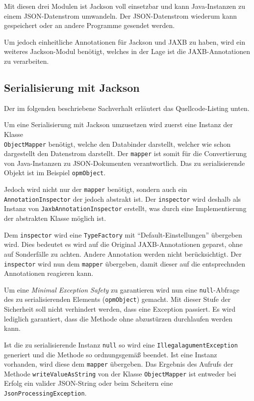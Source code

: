 Mit diesen drei Modulen ist Jackson voll einsetzbar und kann Java-Instanzen zu einem JSON-Datenstrom umwandeln. Der JSON-Datenstrom wiederum kann gespeichert oder an andere Programme gesendet werden.

Um jedoch einheitliche Annotationen f\"ur Jackson und JAXB zu haben, wird ein weiteres Jackson-Modul ben\"otigt, welches in der Lage ist die JAXB-Annotationen zu verarbeiten.\cite{Jackson}

\subsection{Serialisierung mit Jackson}\label{Serialisierung}
Der im folgenden beschriebene Sachverhalt erl\"autert das Quellcode-Listing unten.

Um eine Serialisierung mit Jackson umzusetzen wird zuerst eine Instanz der Klasse \\\texttt{ObjectMapper} ben\"otigt, welche den Databinder darstellt, welcher wie schon dargestellt den Datenstrom darstellt. Der \texttt{mapper} ist somit f\"ur die Convertierung von Java-Instanzen zu JSON-Dokumenten verantwortlich. Das zu serialisierende Objekt ist im Beispiel \texttt{opmObject}.

Jedoch wird nicht nur der \texttt{mapper} ben\"otigt, sondern auch ein \texttt{AnnotationInspector} der jedoch abstrakt ist. Der \texttt{inspector} wird deshalb als Instanz von \texttt{JaxbAnnotationInspector} erstellt, was durch eine Implementierung der abstrakten Klasse m\"oglich ist. 

Dem \texttt{inspector} wird eine \texttt{TypeFactory} mit "`Default-Einstellungen"' \"ubergeben wird. Dies bedeutet es wird auf die Original JAXB-Annotationen geparst, ohne auf Sonderf\"alle zu achten. Andere Annotation werden nicht ber\"ucksichtigt. Der \texttt{inspector} wird nun dem \texttt{mapper} \"ubergeben, damit dieser auf die entsprechnden Annotationen reagieren kann.

Um eine \textit{Minimal Exception Safety} zu garantieren wird nun eine \texttt{null}-Abfrage des zu serialisierenden Elements (\texttt{opmObject}) gemacht. Mit dieser Stufe der Sicherheit soll nicht verhindert werden, dass eine Exception passiert. Es wird lediglich garantiert, dass die Methode ohne abzust\"urzen durchlaufen werden kann. \cite{ExceptionSafety}

Ist die zu serialisierende Instanz \texttt{null} so wird eine \texttt{IllegalagumentException} generiert und die Methode so ordnungsgem\"a\ss{} beendet. Ist eine Instanz vorhanden, wird diese dem \texttt{mapper} \"ubergeben. Das Ergebnis des Aufrufs der Methode \texttt{writeValueAsString} von der Klasse \texttt{ObjectMapper} ist entweder bei Erfolg ein valider JSON-String oder beim Scheitern eine \\\texttt{JsonProcessingException}. 

